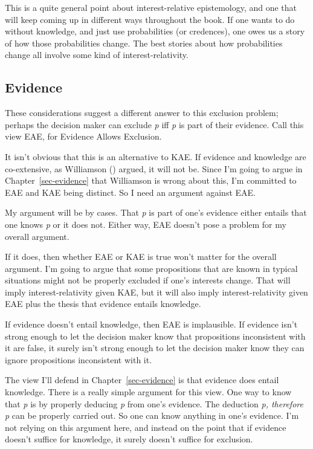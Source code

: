 \documentclass[
  10pt,
  letterpaper,
  twoside]{scrbook}
\begin{document}
This is a quite general point about interest-relative epistemology, and
one that will keep coming up in different ways throughout the book. If
one wants to do without knowledge, and just use probabilities (or
credences), one owes us a story of how those probabilities change. The
best stories about how probabilities change all involve some kind of
interest-relativity.

\subsection{Evidence}\label{sec-kae-evidence}

These considerations suggest a different answer to this exclusion
problem; perhaps the decision maker can exclude \emph{p} iff \emph{p} is
part of their evidence. Call this view EAE, for Evidence Allows
Exclusion.

It isn't obvious that this is an alternative to KAE. If evidence and
knowledge are co-extensive, as Williamson
() argued, it will not be. Since I'm
going to argue in Chapter~\ref{sec-evidence} that Williamson is wrong
about this, I'm committed to EAE and KAE being distinct. So I need an
argument against EAE.

My argument will be by cases. That \emph{p} is part of one's evidence
either entails that one knows \emph{p} or it does not. Either way, EAE
doesn't pose a problem for my overall argument.

If it does, then whether EAE or KAE is true won't matter for the overall
argument. I'm going to argue that some propositions that are known in
typical situations might not be properly excluded if one's interests
change. That will imply interest-relativity given KAE, but it will also
imply interest-relativity given EAE plus the thesis that evidence
entails knowledge.

If evidence doesn't entail knowledge, then EAE is implausible. If
evidence isn't strong enough to let the decision maker know that
propositions inconsistent with it are false, it surely isn't strong
enough to let the decision maker know they can ignore propositions
inconsistent with it.

The view I'll defend in Chapter~\ref{sec-evidence} is that evidence does
entail knowledge. There is a really simple argument for this view. One
way to know that \emph{p} is by properly deducing \emph{p} from one's
evidence. The deduction \emph{p, therefore p} can be properly carried
out. So one can know anything in one's evidence. I'm not relying on this
argument here, and instead on the point that if evidence doesn't suffice
for knowledge, it surely doesn't suffice for exclusion.
\end{document}
